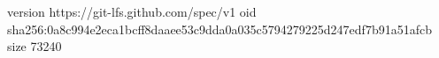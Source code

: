 version https://git-lfs.github.com/spec/v1
oid sha256:0a8c994e2eca1bcff8daaee53c9dda0a035c5794279225d247edf7b91a51afcb
size 73240
